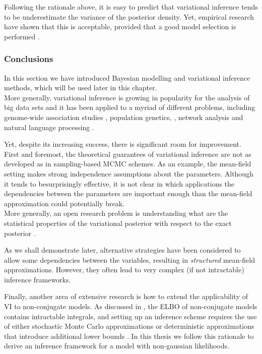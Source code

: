 Following the rationale above, it is easy to predict that variational inference tends to be underestimate the variance of the posterior density. Yet, empirical research have shown that this is acceptable, provided that a good model selection is performed \cite{Blei2006}.

\subsubsection{Conclusions}

In this section we have introduced Bayesian modelling and variational inference methods, which will be used later in this chapter.\\
More generally, variational inference is growing in popularity for the analysis of big data sets and it has been applied to a myriad of different problems, including genome-wide association studies \cite{Carbonetto2012}, population genetics, \cite{Raj2014}, network analysis \cite{Sanguinetti2006} and natural language processing \cite{Blei2003}.

Yet, despite its increasing success, there is significant room for improvement. First and foremost, the theoretical guarantees of variational inference are not as developed as in sampling-based MCMC schemes\cite{Blei2016,Zhang2017,Nakajima2007}. As an example, the mean-field setting makes strong independence assumptions about the parameters.  Although it tends to besurprisingly effective, it is not clear in which applications the dependencies between the parameters are important enough than the mean-field approximation could potentially break.\\
More generally, an open research problem is understanding what are the statistical properties of the variational posterior with respect to the exact posterior \cite{Blei2016,Zhang2017}.

As we shall demonstrate later, alternative strategies have been considered to allow some dependencies between the variables, resulting in \textit{structured} mean-field approximations\cite{Hoffman2014,Titsias2011}. However, they often lead to very complex (if not intractable) inference frameworks. 

Finally, another area of extensive research is how to extend the applicability of VI to non-conjugate models. As discussed in , the ELBO of non-conjugate models contains intractable integrals, and setting up an inference scheme requires the use of either stochastic Monte Carlo approximations or deterministic approximations that introduce additional lower bounds \cite{Zhang2017,Seeger2012,Khan2017}. In this thesis we follow this rationale to derive an inference framework for a model with non-gaussian likelihoods.
